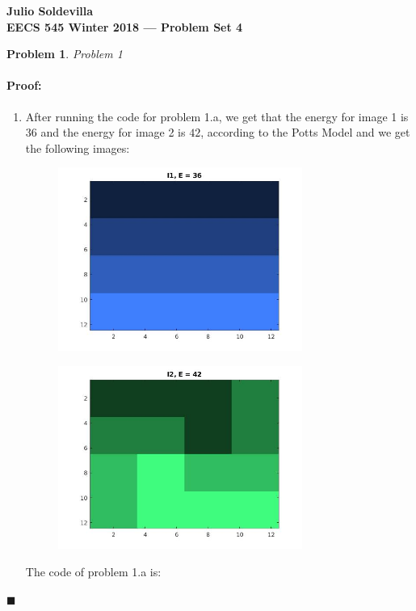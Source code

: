 \documentclass[12pt]{article}
\newenvironment{proof}{\paragraph{Proof: }}{\hfill$\blacksquare$}
\newtheorem{problem}{Problem}%
\begin{document}
\begin{center}
{\bf Julio Soldevilla}
\\
{\bf EECS 545 Winter 2018 --- Problem Set 4 }
\end{center}

\begin{problem}
\normalfont
Problem 1
\end{problem}

\begin{proof}

\begin{enumerate}
\item After running the code for problem 1.a, we get that the energy for image 1 is $36$ and the energy for image 2 is $42$, according to the Potts Model and we get the following images:

\begin{figure}[!htbp]
\centering
\includegraphics[width=8cm]{prob1_a_im1.jpg}
\caption{}
\end{figure}

\begin{figure}[!htbp]
\centering
\includegraphics[width=8cm]{prob1_a_im2.jpg}
\caption{}
\end{figure}

The code of problem 1.a is: 




\end{enumerate}
\end{proof}
\end{document}
